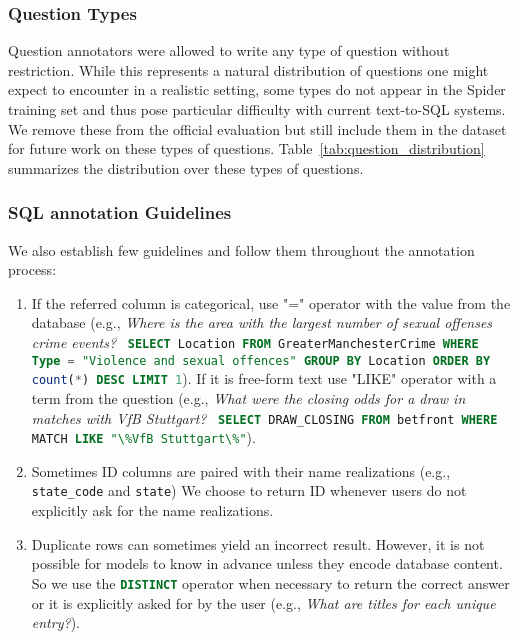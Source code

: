\documentclass[11pt,a4paper]{article}
\newcommand{\sql}[1]{\lstinline[language=SQL, basicstyle=\footnotesize\ttfamily]{#1}}
\begin{document}
\subsubsection{Question Types}
\label{sec:question_types}
Question annotators were allowed to write any type of question without restriction. While this represents a natural distribution of questions one might expect to encounter in a realistic setting, some types do not appear in the Spider training set and thus pose particular difficulty with current text-to-SQL systems. We remove these from the official evaluation but still include them in the dataset for future work on these types of questions. Table~\ref{tab:question_distribution} summarizes the distribution over these types of questions.
\subsubsection{SQL annotation Guidelines}
\label{sec:annotation}
We also establish few guidelines and follow them throughout the annotation process:
\begin{enumerate}[left=0pt]
    \item If the referred column is
        categorical, use "=" operator with the value from the database (e.g., \textit{Where is the area with the largest
            number of sexual offenses crime events?} \textrightarrow\ \sql{SELECT Location FROM GreaterManchesterCrime WHERE Type = "Violence and sexual offences" GROUP BY Location ORDER BY count(*) DESC LIMIT 1}).
            If it is free-form text use
            "LIKE" operator with a term from the question (e.g., \textit{What were the closing odds for a draw in matches with VfB Stuttgart?} \textrightarrow\ \sql{SELECT DRAW_CLOSING FROM betfront WHERE MATCH LIKE "\%VfB Stuttgart\%"}).
\item Sometimes ID columns are paired with their name realizations (e.g., \sql{state_code} and \sql{state})
        We choose to return ID whenever users do not explicitly ask for the name realizations.
    \item Duplicate rows can sometimes yield an incorrect result.
        However, it is not possible for models to know in advance unless they encode database content.
        So we use the \sql{DISTINCT} operator when necessary to return the correct answer or it is explicitly asked for
        by the user (e.g., \textit{What are titles for each unique entry?}).
\end{enumerate}
\end{document}
